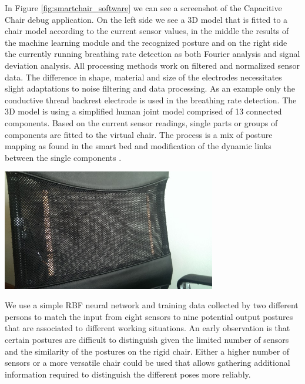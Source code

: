 In Figure \ref{fig:smartchair_software} we can see a screenshot of the Capacitive Chair debug application. On the left side we see a 3D model that is fitted to a chair model according to the current sensor values, in the middle the results of the machine learning module and the recognized posture and on the right side the currently running breathing rate detection as both Fourier analysis and signal deviation analysis.
All processing methods work on filtered and normalized sensor data. The difference in shape, material and size of the electrodes necessitates slight adaptations to noise filtering and data processing. As an example only the conductive thread backrest electrode is used in the breathing rate detection. 
The 3D model is using a simplified human joint model comprised of 13 connected components. Based on the current sensor readings, single parts or groups of components are fitted to the virtual chair. The process is a mix of posture mapping as found in the smart bed and modification of the dynamic links between the single components \cite{Braun2013ChairAid}.

\begin{minipage}{\linewidth}
\centering
\includegraphics[width=0.7\textwidth]{images/smartchair_thread}
\label{fig:smartchair_thread}
\end{minipage}
We use a simple RBF neural network and training data collected by two different persons to match the input from eight sensors to nine potential output postures that are associated to different working situations. An early observation is that certain postures are difficult to distinguish given the limited number of sensors and the similarity of the postures on the rigid chair. Either a higher number of sensors or a more versatile chair could be used that allows gathering additional information required to distinguish the different poses more reliably. 

